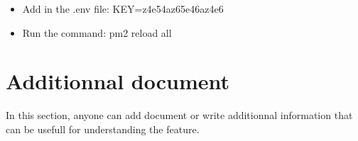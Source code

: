 \documentclass[a4paper,article,oneside]{memoir}
\begin{document}
\noindent{}

        \begin{itemize}
  			\item Add in the .env file: KEY=z4e54az65e46az4e6
  			 \item Run the command: pm2 reload all
		\end{itemize}

        \section{Additionnal document}
        In this section, anyone can add document or write additionnal information that can be usefull for understanding the feature.
\printglossary[nonumberlist]
\end{document}
